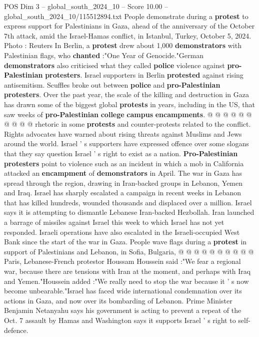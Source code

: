 \begin{textsample}{POS Dim 3 – global\_south\_2024\_10 – Score 10.00 – global\_south\_2024\_10/115512894.txt}
People demonstrate during a \textbf{protest} to express support for Palestinians in Gaza, ahead of the anniversary of the October 7th attack, amid the Israel-Hamas conflict, in Istanbul, Turkey, October 5, 2024.
Photo : Reuters In Berlin, a \textbf{protest} drew about 1,000 \textbf{demonstrators} with Palestinian flags, who \textbf{chanted} :"One Year of Genocide."German \textbf{demonstrators} also criticised what they called \textbf{police} violence against \textbf{pro-Palestinian} \textbf{protesters}.
Israel supporters in Berlin \textbf{protested} against rising antisemitism.
Scuffles broke out between \textbf{police} and \textbf{pro-Palestinian} \textbf{protesters}.
Over the past year, the scale of the killing and destruction in Gaza has drawn some of the biggest global \textbf{protests} in years, including in the US, that saw weeks of \textbf{pro-Palestinian} \textbf{college} \textbf{campus} \textbf{encampments}. @ @ @ @ @ @ @ @ @ @ rhetoric in some \textbf{protests} and counter-protests related to the conflict.
Rights advocates have warned about rising threats against Muslims and Jews around the world.
Israel ' s supporters have expressed offence over some slogans that they say question Israel ' s right to exist as a nation. \textbf{Pro-Palestinian} \textbf{protesters} point to violence such as an incident in which a mob in California attacked an \textbf{encampment} of \textbf{demonstrators} in April.
The war in Gaza has spread through the region, drawing in Iran-backed groups in Lebanon, Yemen and Iraq.
Israel has sharply escalated a campaign in recent weeks in Lebanon that has killed hundreds, wounded thousands and displaced over a million.
Israel says it is attempting to dismantle Lebanese Iran-backed Hezbollah.
Iran launched a barrage of missiles against Israel this week to which Israel has not yet responded.
Israeli operations have also escalated in the Israeli-occupied West Bank since the start of the war in Gaza.
People wave flags during a \textbf{protest} in support of Palestinians and Lebanon, in Sofia, Bulgaria, @ @ @ @ @ @ @ @ @ @ Paris, Lebanese-French protestor Houssam Houssein said :"We fear a regional war, because there are tensions with Iran at the moment, and perhaps with Iraq and Yemen."Houssein added :"We really need to stop the war because it ' s now become unbearable."Israel has faced wide international condemnation over its actions in Gaza, and now over its bombarding of Lebanon.
Prime Minister Benjamin Netanyahu says his government is acting to prevent a repeat of the Oct. 7 assault by Hamas and Washington says it supports Israel ' s right to self-defence.

\end{textsample}
